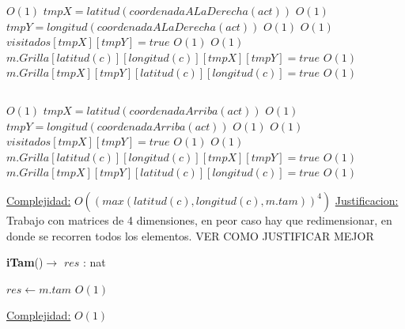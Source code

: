 \begin{Algoritmos}
\begin{algorithmic}[1]
\State $ $


      \Comment $O(1)$
\State $tmpX = latitud(coordenadaALaDerecha(act))$   \Comment $O(1)$
\State $tmpY = longitud(coordenadaALaDerecha(act))$  \Comment $O(1)$
    \Comment $O(1)$
\State $visitados[tmpX][tmpY] = true$    \Comment $O(1)$
	 	\Comment $O(1)$
		\State $m.Grilla[latitud(c)][longitud(c)][tmpX][tmpY] = true$ \Comment $O(1)$
		\State $m.Grilla[tmpX][tmpY][latitud(c)][longitud(c)] = true$ \Comment $O(1)$
	\EndIf
\EndIf
\EndIf

\State $ $

      \Comment $O(1)$
\State $tmpX = latitud(coordenadaArriba(act))$   \Comment $O(1)$
\State $tmpY = longitud(coordenadaArriba(act))$  \Comment $O(1)$
    \Comment $O(1)$
\State $visitados[tmpX][tmpY] = true$    \Comment $O(1)$
	 	\Comment $O(1)$
		\State $m.Grilla[latitud(c)][longitud(c)][tmpX][tmpY] = true$ \Comment $O(1)$
		\State $m.Grilla[tmpX][tmpY][latitud(c)][longitud(c)] = true$ \Comment $O(1)$
	\EndIf
\EndIf
\EndIf


\EndWhile

\medskip
\Statex \underline{Complejidad:} $O((max(latitud(c), longitud(c), m.tam))^4)$
\Statex \underline{Justificacion:} Trabajo con matrices de 4 dimensiones, en peor caso hay que redimensionar, en donde se recorren todos los elementos. VER COMO JUSTIFICAR MEJOR


\end{algorithmic}



\begin{algorithm}[H]
{\textbf{iTam}()$\to$ $res$ : nat}
\begin{algorithmic}[1]

\State $res \gets m.tam$ \Comment $O(1)$

\medskip
\Statex \underline{Complejidad:} $O(1)$

\end{algorithmic}
\end{algorithm}


  
\end{Algoritmos}